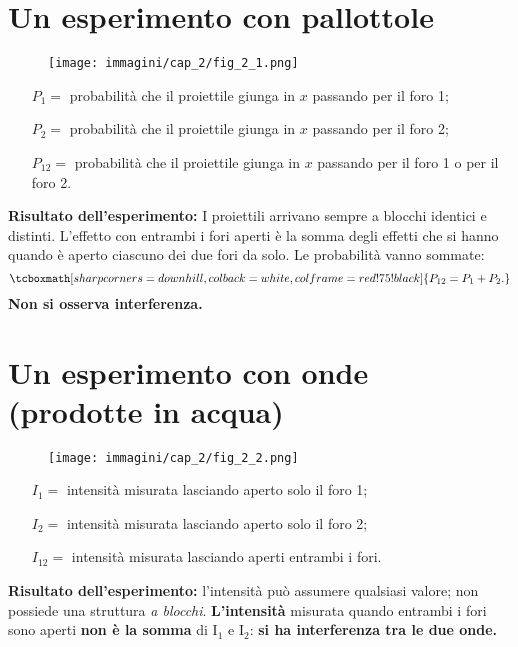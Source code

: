 \section*{Un esperimento con pallottole}
\begin{figure}[!htbp]
\begin{center}
\texttt{[image: immagini/cap\_2/fig\_2\_1.png]}
\end{center}
\end{figure}
\begin{itemize}
\item[$P_1=$ ]probabilità che il proiettile giunga in $x$ passando per il foro 1;
\item[$P_2=$ ]probabilità che il proiettile giunga in $x$ passando per il foro 2;
\item[$P_{12}=$ ]probabilità che il proiettile giunga in $x$ passando per il foro 1 o per il foro 2.
\end{itemize}
\textbf{Risultato dell'esperimento:} I proiettili arrivano sempre a blocchi identici e distinti. L'effetto con entrambi i fori aperti è la somma degli effetti che si hanno quando è aperto ciascuno dei due fori da solo. Le probabilità vanno sommate:
	\begin{equation}
	\tcboxmath[sharp corners=downhill ,colback=white,colframe=red!75!black]{
		P_{12}=P_1+P_2.
		}
\end{equation}
\textbf{Non si osserva interferenza.}
\newpage
\section*{Un esperimento con onde (prodotte in acqua)}
\begin{figure}[!htbp]
\begin{center}
\texttt{[image: immagini/cap\_2/fig\_2\_2.png]}
\end{center}
\end{figure}
\begin{itemize}
\item[$I_1=$ ]intensità misurata lasciando aperto solo il foro 1;
\item[$I_2=$ ]intensità misurata lasciando aperto solo il foro 2;
\item[$I_{12}=$ ]intensità misurata lasciando aperti entrambi i fori.
\end{itemize}
\textbf{Risultato dell'esperimento:} l'intensità  può assumere qualsiasi valore; non possiede una struttura \textit{a blocchi}. \textbf{L'intensità} misurata quando entrambi i fori sono aperti \textbf{non è la somma} di I$_1$ e I$_2$: \textbf{si ha interferenza tra le due onde.}
